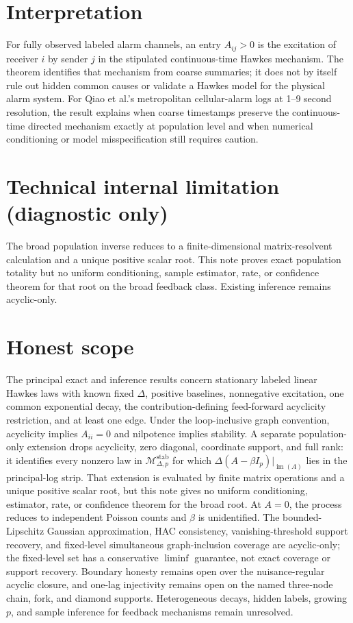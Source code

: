 \documentclass{article}
\begin{document}
\section{Interpretation}

For fully observed labeled alarm channels, an entry \(A_{ij}>0\) is the excitation of receiver \(i\) by sender \(j\) in the stipulated continuous-time Hawkes mechanism. The theorem identifies that mechanism from coarse summaries; it does not by itself rule out hidden common causes or validate a Hawkes model for the physical alarm system. For Qiao et al.'s metropolitan cellular-alarm logs at 1--9 second resolution, the result explains when coarse timestamps preserve the continuous-time directed mechanism exactly at population level and when numerical conditioning or model misspecification still requires caution.

\section*{Technical internal limitation (diagnostic only)}

The broad population inverse reduces to a finite-dimensional matrix-resolvent calculation and a unique positive scalar root. This note proves exact population totality but no uniform conditioning, sample estimator, rate, or confidence theorem for that root on the broad feedback class. Existing inference remains acyclic-only.

\section{Honest scope}

The principal exact and inference results concern stationary labeled linear Hawkes laws with known fixed \(\Delta\), positive baselines, nonnegative excitation, one common exponential decay, the contribution-defining feed-forward acyclicity restriction, and at least one edge. Under the loop-inclusive graph convention, acyclicity implies \(A_{ii}=0\) and nilpotence implies stability. A separate population-only extension drops acyclicity, zero diagonal, coordinate support, and full rank: it identifies every nonzero law in \(\mathcal M_{\Delta,p}^{\mathrm{stab}}\) for which \(\Delta(A-\beta I_p)|_{\operatorname{im}(A)}\) lies in the principal-log strip. That extension is evaluated by finite matrix operations and a unique positive scalar root, but this note gives no uniform conditioning, estimator, rate, or confidence theorem for the broad root. At \(A=0\), the process reduces to independent Poisson counts and \(\beta\) is unidentified. The bounded-Lipschitz Gaussian approximation, HAC consistency, vanishing-threshold support recovery, and fixed-level simultaneous graph-inclusion coverage are acyclic-only; the fixed-level set has a conservative \(\liminf\) guarantee, not exact coverage or support recovery. Boundary honesty remains open over the nuisance-regular acyclic closure, and one-lag injectivity remains open on the named three-node chain, fork, and diamond supports. Heterogeneous decays, hidden labels, growing \(p\), and sample inference for feedback mechanisms remain unresolved.
\end{document}
